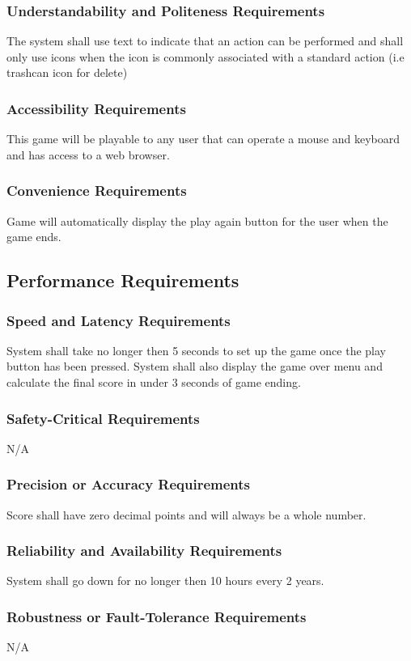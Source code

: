 \documentclass[12pt, titlepage]{article}
\begin{document}
\subsubsection{Understandability and Politeness Requirements }
The system shall use text to indicate that an action can be performed and shall only use icons when the icon is commonly associated with a standard action (i.e trashcan icon for delete)
\subsubsection{Accessibility Requirements}
This game will be playable to any user that can operate a mouse and keyboard and has access to a web browser.
\subsubsection{Convenience Requirements}
Game will automatically display the play again button for the user when the game ends.


\subsection{Performance Requirements}
\subsubsection{Speed and Latency Requirements}
System shall take no longer then 5 seconds to set up the game once the play button has been pressed. System shall also display the game over menu and calculate the final score in under 3 seconds of game ending.
\subsubsection{Safety-Critical Requirements}
N/A
\subsubsection{Precision or Accuracy Requirements}
Score shall have zero decimal points and will always be a whole number.
\subsubsection{Reliability and Availability Requirements}
System shall go down for no longer then 10 hours every 2 years.
\subsubsection{Robustness or Fault-Tolerance Requirements}
N/A
\end{document}

